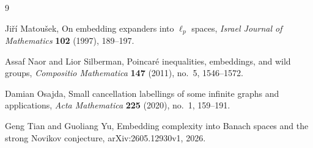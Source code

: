 \documentclass[11pt]{article}
\begin{document}
\begin{thebibliography}{9}

Ji\v{r}\'i Matou\v{s}ek,
\newblock On embedding expanders into $\ell_p$ spaces,
\newblock \emph{Israel Journal of Mathematics} \textbf{102} (1997), 189--197.

Assaf Naor and Lior Silberman,
\newblock Poincar\'e inequalities, embeddings, and wild groups,
\newblock \emph{Compositio Mathematica} \textbf{147} (2011), no.~5, 1546--1572.

Damian Osajda,
\newblock Small cancellation labellings of some infinite graphs and applications,
\newblock \emph{Acta Mathematica} \textbf{225} (2020), no.~1, 159--191.

Geng Tian and Guoliang Yu,
\newblock Embedding complexity into Banach spaces and the strong Novikov conjecture,
\newblock arXiv:2605.12930v1, 2026.

\end{thebibliography}
\end{document}
